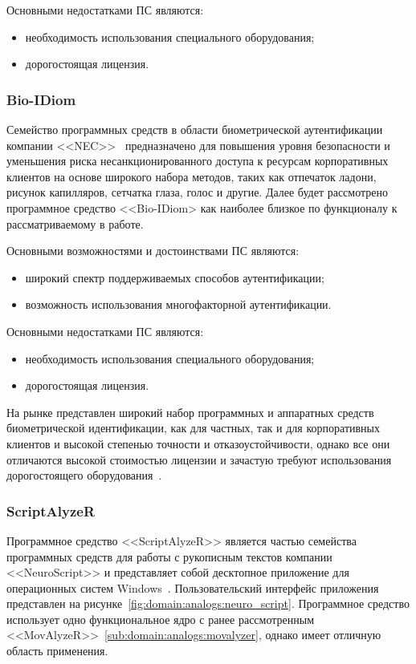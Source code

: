 Основными недостатками ПС являются:
\begin{itemize}
  \item необходимость использования специального оборудования;
  \item дорогостоящая лицензия.
\end{itemize}

\subsubsection{Bio-IDiom}
\label{sub:domain:analogs:nec}
Семейство программных средств в области биометрической аутентификации компании <<NEC>>~\cite{analogs_nec} предназначено для повышения уровня безопасности и уменьшения риска несанкционированного доступа к ресурсам корпоративных клиентов на основе широкого набора методов, таких как отпечаток ладони, рисунок капилляров, сетчатка глаза, голос и другие. Далее будет рассмотрено программное средство <<Bio-IDiom> как наиболее близкое по функционалу к рассматриваемому в работе.

Основными возможностями и достоинствами ПС являются:
\begin{itemize}
  \item широкий спектр поддерживаемых способов аутентификации;
  \item возможность использования многофакторной аутентификации.
\end{itemize}

Основными недостатками ПС являются:
\begin{itemize}
  \item необходимость использования специального оборудования;
  \item дорогостоящая лицензия.
\end{itemize}

На рынке представлен широкий набор программных и аппаратных средств биометрической идентификации, как для частных, так и для корпоративных клиентов и высокой степенью точности и отказоустойчивости, однако все они отличаются высокой стоимостью лицензии и зачастую требуют использования дорогостоящего оборудования~\cite{wacom_lcd}.

\subsubsection{ScriptAlyzeR}
\label{sub:domain:analogs:neuro_script}
Программное средство <<ScriptAlyzeR>> является частью семейства программных средств для работы с рукописным текстов компании <<NeuroScript>> и представляет собой десктопное приложение для операционных систем Windows~\cite{analogs_scriptAlyzer}. Пользовательский интерфейс приложения представлен на рисунке~\ref{fig:domain:analogs:neuro_script}. Программное средство использует одно функциональное ядро с ранее рассмотренным <<MovAlyzeR>>~\ref{sub:domain:analogs:movalyzer}, однако имеет отличную область применения.

